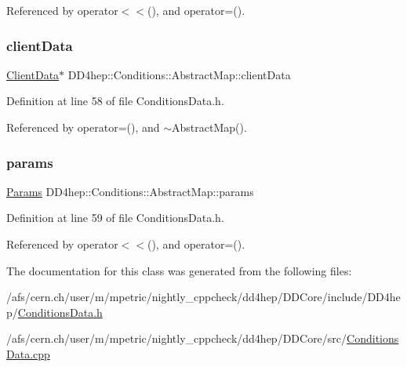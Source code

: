 Referenced by operator$<$$<$(), and operator=().

\hypertarget{class_d_d4hep_1_1_conditions_1_1_abstract_map_a4255c1d1d93eb1ecfee921ed752a54da}{}\label{class_d_d4hep_1_1_conditions_1_1_abstract_map_a4255c1d1d93eb1ecfee921ed752a54da} 
\subsubsection{\texorpdfstring{client\+Data}{clientData}}
{\footnotesize\ttfamily \hyperlink{struct_d_d4hep_1_1_conditions_1_1_client_data}{Client\+Data}$\ast$ D\+D4hep\+::\+Conditions\+::\+Abstract\+Map\+::client\+Data}



Definition at line 58 of file Conditions\+Data.\+h.



Referenced by operator=(), and $\sim$\+Abstract\+Map().

\hypertarget{class_d_d4hep_1_1_conditions_1_1_abstract_map_ae2e1b9489f65c31a0bb1c1851686cca4}{}\label{class_d_d4hep_1_1_conditions_1_1_abstract_map_ae2e1b9489f65c31a0bb1c1851686cca4} 
\subsubsection{\texorpdfstring{params}{params}}
{\footnotesize\ttfamily \hyperlink{class_d_d4hep_1_1_conditions_1_1_abstract_map_a0a7595cac22aa8ddc6f6900d7883c2fc}{Params} D\+D4hep\+::\+Conditions\+::\+Abstract\+Map\+::params}



Definition at line 59 of file Conditions\+Data.\+h.



Referenced by operator$<$$<$(), and operator=().



The documentation for this class was generated from the following files\+:\begin{DoxyCompactItemize}
\item 
/afs/cern.\+ch/user/m/mpetric/nightly\+\_\+cppcheck/dd4hep/\+D\+D\+Core/include/\+D\+D4hep/\hyperlink{_conditions_data_8h}{Conditions\+Data.\+h}\item 
/afs/cern.\+ch/user/m/mpetric/nightly\+\_\+cppcheck/dd4hep/\+D\+D\+Core/src/\hyperlink{_conditions_data_8cpp}{Conditions\+Data.\+cpp}\end{DoxyCompactItemize}
